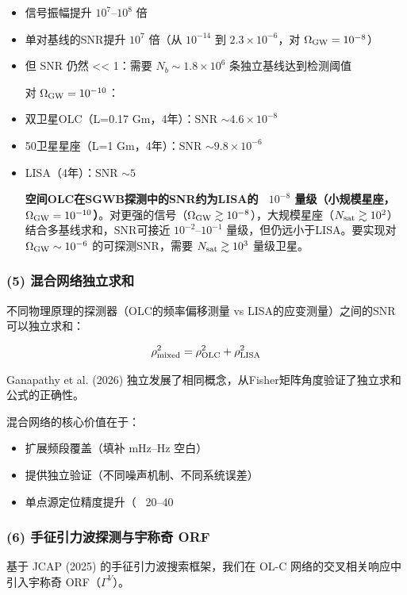 \documentclass[12pt,a4paper]{article}
\begin{document}
\begin{itemize}
  \item 信号振幅提升 $10^7$–$10^8$ 倍
  \item 单对基线的SNR提升 $10^7$ 倍（从 $10^{-14}$ 到 $2.3 \times 10^{-6}$，对 $\Omega_{\rm GW} = 10^{-8}$）
  \item 但 SNR 仍然 << 1：需要 $N_b \sim 1.8 \times 10^6$ 条独立基线达到检测阈值

对 $\Omega_{\rm GW} = 10^{-10}$：
  \item 双卫星OLC（L=0.17 Gm，4年）：SNR $\sim 4.6 \times 10^{-8}$
  \item 50卫星星座（L=1 Gm，4年）：SNR $\sim 9.8 \times 10^{-6}$
  \item LISA（4年）：SNR $\sim 5$

\textbf{空间OLC在SGWB探测中的SNR约为LISA的 ~$10^{-8}$ 量级（小规模星座，$\Omega_{\rm GW} = 10^{-10}$）}。对更强的信号（$\Omega_{\rm GW} \gtrsim 10^{-8}$），大规模星座（$N_{\rm sat} \gtrsim 10^2$）结合多基线求和，SNR可接近 $10^{-2}$–$10^{-1}$ 量级，但仍远小于LISA。要实现对 $\Omega_{\rm GW} \sim 10^{-6}$ 的可探测SNR，需要 $N_{\rm sat} \gtrsim 10^3$ 量级卫星。

\end{itemize}
\subsubsection{(5) 混合网络独立求和}


不同物理原理的探测器（OLC的频率偏移测量 vs LISA的应变测量）之间的SNR可以独立求和：

$$\rho_{\rm mixed}^2 = \rho_{\rm OLC}^2 + \rho_{\rm LISA}^2$$

Ganapathy et al. (2026) 独立发展了相同概念，从Fisher矩阵角度验证了独立求和公式的正确性。

混合网络的核心价值在于：
\begin{itemize}
  \item 扩展频段覆盖（填补 mHz–Hz 空白）
  \item 提供独立验证（不同噪声机制、不同系统误差）
  \item 单点源定位精度提升（~ 20–40%

\end{itemize}

\subsubsection{(6) 手征引力波探测与宇称奇 ORF}

基于 JCAP (2025) 的手征引力波搜索框架，我们在 OL-C 网络的交叉相关响应中引入宇称奇 ORF（$\Gamma^V$）。
\end{document}
